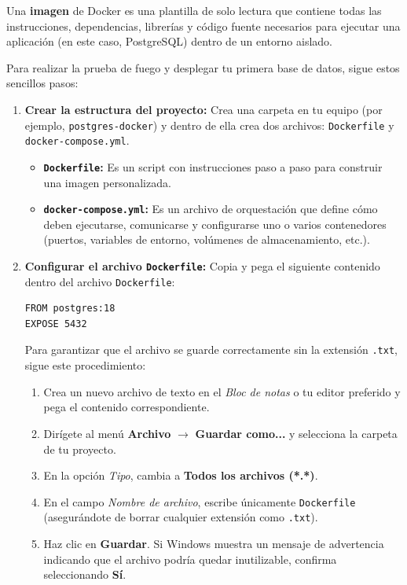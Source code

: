 \documentclass[11pt, a4paper]{article}
\begin{document}
\begin{tcolorbox}[colback=blue!5!white,colframe=blue!75!black,title=\textbf{¿Qué es una imagen en Docker?}]
Una \textbf{imagen} de Docker es una plantilla de solo lectura que contiene todas las instrucciones, dependencias, librerías y código fuente necesarios para ejecutar una aplicación (en este caso, PostgreSQL) dentro de un entorno aislado.
\end{tcolorbox}

Para realizar la prueba de fuego y desplegar tu primera base de datos, sigue estos sencillos pasos:

\begin{enumerate}
    \item \textbf{Crear la estructura del proyecto:}
    Crea una carpeta en tu equipo (por ejemplo, \texttt{postgres-docker}) y dentro de ella crea dos archivos: \texttt{Dockerfile} y \texttt{docker-compose.yml}.

    \begin{tcolorbox}[colback=yellow!10!white,colframe=yellow!50!black,title=\textbf{¿Qué son los archivos Dockerfile y .yml?}]
    \begin{itemize}
        \item \textbf{\texttt{Dockerfile}:} Es un script con instrucciones paso a paso para construir una imagen personalizada.
        \item \textbf{\texttt{docker-compose.yml}:} Es un archivo de orquestación que define cómo deben ejecutarse, comunicarse y configurarse uno o varios contenedores (puertos, variables de entorno, volúmenes de almacenamiento, etc.).
    \end{itemize}
\end{tcolorbox}

    \item \textbf{Configurar el archivo \texttt{Dockerfile}:}
    Copia y pega el siguiente contenido dentro del archivo \texttt{Dockerfile}:

\begin{lstlisting}
FROM postgres:18
EXPOSE 5432
\end{lstlisting}
Para garantizar que el archivo se guarde correctamente sin la extensión \texttt{.txt}, sigue este procedimiento:

\begin{enumerate}
    \item Crea un nuevo archivo de texto en el \textit{Bloc de notas} o tu editor preferido y pega el contenido correspondiente.
    \item Dirígete al menú \textbf{Archivo} $\rightarrow$ \textbf{Guardar como...} y selecciona la carpeta de tu proyecto.
    \item En la opción \textit{Tipo}, cambia a \textbf{Todos los archivos (*.*)}.
    \item En el campo \textit{Nombre de archivo}, escribe únicamente \texttt{Dockerfile} (asegurándote de borrar cualquier extensión como \texttt{.txt}).
    \item Haz clic en \textbf{Guardar}. Si Windows muestra un mensaje de advertencia indicando que el archivo podría quedar inutilizable, confirma seleccionando \textbf{Sí}.
\end{enumerate}


\end{enumerate}
\end{document}
